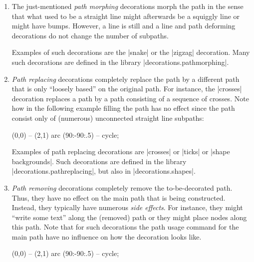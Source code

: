 \begin{enumerate}
    \item The just-mentioned \emph{path morphing} decorations morph the path in
        the sense that what used to be a straight line might afterwards be a
        squiggly line or might have bumps. However, a line is still and a line
        and path deforming decorations do not change the number of subpaths.

        Examples of such decorations are the |snake| or the |zigzag|
        decoration. Many such decorations are defined in the library
        |decorations.pathmorphing|.

    \item \emph{Path replacing} decorations completely replace the path by a
        different path that is only ``loosely based'' on the original path. For
        instance, the |crosses| decoration replaces a path by a path consisting
        of a sequence of crosses. Note how in the following example filling the
        path has no effect since the path consist only of (numerous)
        unconnected straight line subpaths:
\begin{codeexample}[preamble={\usetikzlibrary{decorations.shapes}}]
\tikz \fill [decorate,decoration={crosses}]
  [fill=blue!20,draw=blue,thick] (0,0) -- (2,1) arc (90:-90:.5) -- cycle;
\end{codeexample}

        Examples of path replacing decorations are |crosses| or |ticks| or
        |shape backgrounds|. Such decorations are defined in the library
        |decorations.pathreplacing|, but also in |decorations.shapes|.
    \item \emph{Path removing} decorations completely remove the
        to-be-decorated path. Thus, they have no effect on the main path that
        is being constructed. Instead, they typically have numerous \emph{side
        effects}. For instance, they might ``write some text'' along the
        (removed) path or they might place nodes along this path. Note that for
        such decorations the path usage command for the main path have no
        influence on how the decoration looks like.
\begin{codeexample}[preamble={\usetikzlibrary{decorations.text}}]
\tikz \fill [decorate,decoration={text along path,
               text=This is a text along a path. Note how the path is lost.}]
  [fill=blue!20,draw=blue,thick] (0,0) -- (2,1) arc (90:-90:.5) -- cycle;
\end{codeexample}
\end{enumerate}

